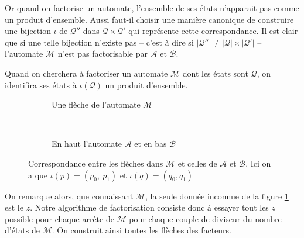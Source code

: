 \documentclass[11pt,a4paper]{article}
\begin{document}
Or quand on factorise un automate, l'ensemble de ses états n'apparait pas comme un produit d'ensemble. Aussi faut-il choisir une manière canonique de construire une bijection $\iota$ de $\mathcal{Q''}$ dans $\mathcal{Q}\times\mathcal{Q'}$ qui représente cette correspondance. Il est clair que si une telle bijection n'existe pas -- c'est à dire si $|\mathcal{Q}''| \ne |\mathcal{Q}|\times|\mathcal{Q'}|$ -- l'automate $\mathcal{M}$ n'est pas factorisable par $\mathcal{A}$ et $\mathcal{B}$.

Quand on cherchera à factoriser un automate $\mathcal{M}$ dont les états sont $\mathcal{Q}$, on identifira ses états à $\iota(\mathcal{Q})$ un produit d'ensemble.

\begin{figure}[h!]
  \begin{subfigure}[b]{0.5\textwidth}
    \centering
    \caption{Une flèche de l'automate $\mathcal{M}$}
  \end{subfigure}
  ~
  \begin{subfigure}[b]{0.5\textwidth}
    \centering
    \caption{En haut l'automate $\mathcal{A}$ et en bas $\mathcal{B}$\label{fig:factor-ab}}
  \end{subfigure}
  \caption{Correspondance entre les flèches dans $\mathcal{M}$ et celles de $\mathcal{A}$ et $\mathcal{B}$. Ici on a que $\iota(p) = (p_0,~p_1)$ et $\iota(q)=(q_0, q_1)$\label{fig:facto}}
\end{figure}

On remarque alors, que connaissant $\mathcal{M}$, la seule donnée inconnue de la figure \ref{fig:factor-ab} est le $z$. Notre algorithme de factorisation consiste donc à essayer tout les $z$ possible pour chaque arrête de $\mathcal{M}$ pour chaque couple de diviseur du nombre d'états de $\mathcal{M}$. On construit ainsi toutes les flèches des facteurs.
\end{document}
